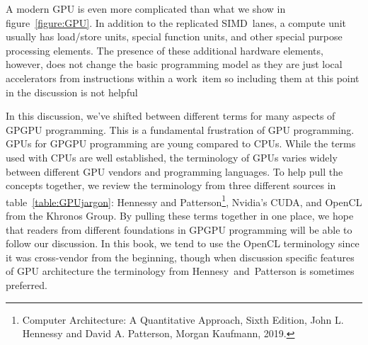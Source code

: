 A modern GPU is even more complicated than what we show in figure~\ref{figure:GPU}.  In addition to
the replicated SIMD~lanes, a compute unit usually has load/store units, special function units, and other
special purpose processing elements.  The presence of these additional hardware elements, however,
does not change the basic programming model as they are just local accelerators from instructions within a 
work~item so including them at this point in the discussion is not helpful 

In this discussion, we've shifted between different terms for many aspects of GPGPU programming.
This is a fundamental frustration of GPU programming. 
GPUs for GPGPU programming are young compared to CPUs.  
While the terms used with CPUs are well established,
the terminology of GPUs varies widely between different GPU vendors and programming
languages.  To help pull the concepts together, we review the terminology from three
different sources in table~\ref{table:GPUjargon}: Hennessy and 
Patterson\footnote{Computer Architecture: A Quantitative Approach, Sixth Edition, 
John L. Hennessy and David A. Patterson, Morgan Kaufmann, 2019.}, Nvidia's CUDA, 
and OpenCL from the Khronos Group.  By pulling these terms together in one place, we
hope that readers from different foundations in GPGPU programming will be able to follow 
our discussion.  In this book, we tend to use the OpenCL terminology since it was cross-vendor
from the beginning, though when discussion specific features of GPU architecture the terminology 
from Hennesy~and~Patterson is sometimes preferred.

